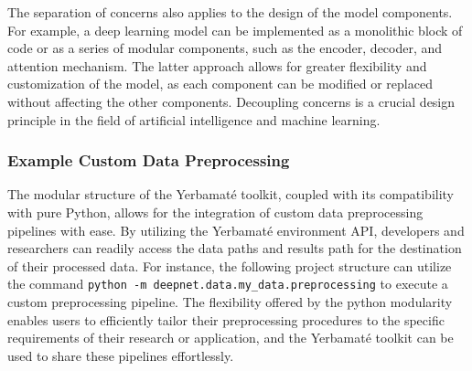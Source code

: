 \documentclass{IEEEtran}
\begin{document}
The separation of concerns also applies to the design of the model components. For example, a deep learning model can be implemented as a monolithic block of code or as a series of modular components, such as the encoder, decoder, and attention mechanism. The latter approach allows for greater flexibility and customization of the model, as each component can be modified or replaced without affecting the other components. Decoupling concerns is a crucial design principle in the field of artificial intelligence and machine learning. 


\subsubsection{Example Custom Data Preprocessing}
The modular structure of the Yerbamaté toolkit, coupled with its compatibility with pure Python, allows for the integration of custom data preprocessing pipelines with ease. By utilizing the Yerbamaté environment API, developers and researchers can readily access the data paths and results path for the destination of their processed data. For instance, the following project structure can utilize the command \texttt{python -m deepnet.data.my\_data.preprocessing} to execute a custom preprocessing pipeline. The flexibility offered by the python modularity enables users to efficiently tailor their preprocessing procedures to the specific requirements of their research or application, and the Yerbamaté toolkit can be used to share these pipelines effortlessly.

\end{document}
